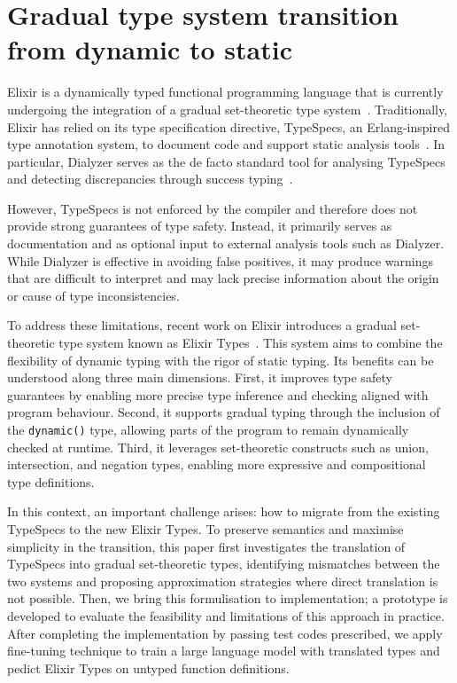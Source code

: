 \section{Gradual type system transition from dynamic to static}


Elixir is a dynamically typed functional programming language that is currently undergoing the integration of a gradual set-theoretic type system~\cite{elixir-lang}.
Traditionally, Elixir has relied on its type specification directive, TypeSpecs, an Erlang-inspired type annotation system, to document code and support static analysis tools~\cite{elixir-typespecs}.
In particular, Dialyzer serves as the de facto standard tool for analysing TypeSpecs and detecting discrepancies through success typing~\cite{lindahl2006practical}.

However, TypeSpecs is not enforced by the compiler and therefore does not provide strong guarantees of type safety.
Instead, it primarily serves as documentation and as optional input to external analysis tools such as Dialyzer.
While Dialyzer is effective in avoiding false positives, it may produce warnings that are difficult to interpret and may lack precise information about the origin or cause of type inconsistencies.

To address these limitations, recent work on Elixir introduces a gradual set-theoretic type system known as Elixir Types~\cite{duboc2024}.
This system aims to combine the flexibility of dynamic typing with the rigor of static typing. Its benefits can be understood along three main dimensions.
First, it improves type safety guarantees by enabling more precise type inference and checking aligned with program behaviour.
Second, it supports gradual typing through the inclusion of the \texttt{dynamic()} type, allowing parts of the program to remain dynamically checked at runtime.
Third, it leverages set-theoretic constructs such as union, intersection, and negation types, enabling more expressive and compositional type definitions.

In this context, an important challenge arises: how to migrate from the existing TypeSpecs to the new Elixir Types.
To preserve semantics and maximise simplicity in the transition, this paper first investigates the translation of TypeSpecs into gradual set-theoretic types, identifying mismatches between the two systems and proposing approximation strategies where direct translation is not possible. 
Then, we bring this formulisation to implementation; a prototype is developed to evaluate the feasibility and limitations of this approach in practice.
After completing the implementation by passing test codes prescribed, we apply fine-tuning technique to train a large language model with translated types and pedict Elixir Types on untyped function definitions.